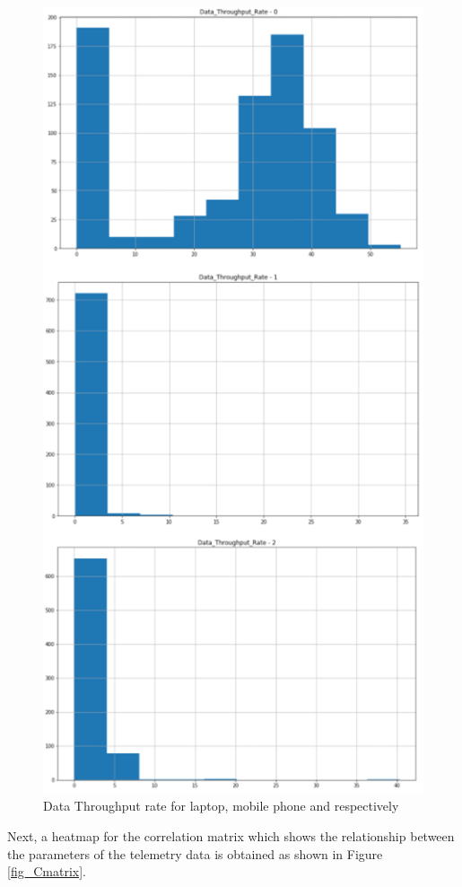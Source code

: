 \begin{figure}[ht]
    \centering
    \includegraphics[scale=0.9]{pages/Chapter4/Chapter 4 Images/Throughput.PNG}
    \caption{Data Throughput rate for laptop, mobile phone and respectively}
    \label{fig_t3}
\end{figure}

Next, a heatmap for the correlation matrix which shows the relationship between the parameters of the telemetry data is obtained as shown in Figure \ref{fig_Cmatrix}. 

